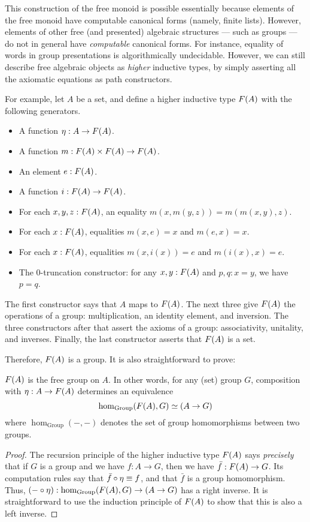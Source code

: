 This construction of the free monoid is possible essentially because elements of the free monoid have computable canonical forms (namely, finite lists).
However, elements of other free (and presented) algebraic structures --- such as groups --- do not in general have \emph{computable} canonical forms.
For instance, equality of words in group presentations is algorithmically undecidable.
However, we can still describe free algebraic objects as \emph{higher} inductive types, by simply asserting all the axiomatic equations as path constructors.

For example, let $A$ be a set, and define a higher inductive type $F(A)$ with the following generators.
\begin{itemize}
\item A function $\eta:A\to F(A)$.
\item A function $m: F(A) \times F(A) \to F(A)$.
\item An element $e:F(A)$.
\item A function $i:F(A) \to F(A)$.
\item For each $x,y,z:F(A)$, an equality $m(x,m(y,z)) = m(m(x,y),z)$.
\item For each $x:F(A)$, equalities $m(x,e) = x$ and $m(e,x) = x$.
\item For each $x:F(A)$, equalities $m(x,i(x)) = e$ and $m(i(x),x) = e$.
\item The $0$-truncation constructor: for any $x,y:F(A)$ and $p,q:x=y$, we have $p=q$.
\end{itemize}
The first constructor says that $A$ maps to $F(A)$.
The next three give $F(A)$ the operations of a group: multiplication, an identity element, and inversion.
The three constructors after that assert the axioms of a group: associativity, unitality, and inverses.
Finally, the last constructor asserts that $F(A)$ is a set.

Therefore, $F(A)$ is a group.
It is also straightforward to prove:

\begin{thm}
  $F(A)$ is the free group on $A$.
  In other words, for any (set) group $G$, composition with $\eta:A\to F(A)$ determines an equivalence
  \[ \hom_{\mathrm{Group}}(F(A),G) \simeq (A\to G) \]
  where $\hom_{\mathrm{Group}}(-,-)$ denotes the set of group homomorphisms between two groups.
\end{thm}
\begin{proof}
  The recursion principle of the higher inductive type $F(A)$ says \emph{precisely} that if $G$ is a group and we have $f:A\to G$, then we have $\bar{f}:F(A) \to G$.
  Its computation rules say that $\bar{f}\circ \eta \equiv f$, and that $\bar f$ is a group homomorphism.
  Thus, $(-\circ \eta) :  \hom_{\mathrm{Group}}(F(A),G) \to (A\to G)$ has a right inverse.
  It is straightforward to use the induction principle of $F(A)$ to show that this is also a left inverse.
\end{proof}

